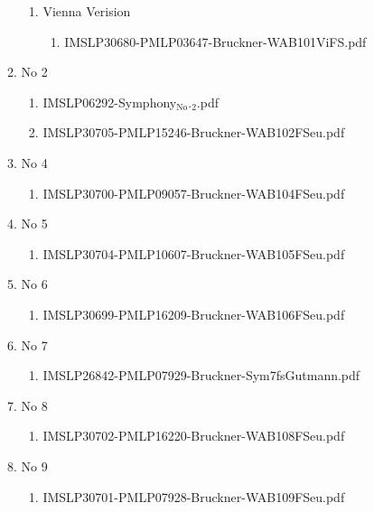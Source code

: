\documentclass[11pt]{article}
\begin{document}
\begin{enumerate}
\begin{enumerate}
\begin{enumerate}
\item Vienna Verision
\label{sec-1-1-1-1-44-16-1-2-2}
\begin{enumerate}
\item IMSLP30680-PMLP03647-Bruckner-WAB101ViFS.pdf
\label{sec-1-1-1-1-44-16-1-2-2-1}
\end{enumerate}
\end{enumerate}

\item No 2
\label{sec-1-1-1-1-44-16-1-3}
\begin{enumerate}
\item IMSLP06292-Symphony$_{\text{No}}$.$_{\text{2}}$.pdf
\label{sec-1-1-1-1-44-16-1-3-1}

\item IMSLP30705-PMLP15246-Bruckner-WAB102FSeu.pdf
\label{sec-1-1-1-1-44-16-1-3-2}
\end{enumerate}

\item No 4
\label{sec-1-1-1-1-44-16-1-4}
\begin{enumerate}
\item IMSLP30700-PMLP09057-Bruckner-WAB104FSeu.pdf
\label{sec-1-1-1-1-44-16-1-4-1}
\end{enumerate}

\item No 5
\label{sec-1-1-1-1-44-16-1-5}
\begin{enumerate}
\item IMSLP30704-PMLP10607-Bruckner-WAB105FSeu.pdf
\label{sec-1-1-1-1-44-16-1-5-1}
\end{enumerate}

\item No 6
\label{sec-1-1-1-1-44-16-1-6}
\begin{enumerate}
\item IMSLP30699-PMLP16209-Bruckner-WAB106FSeu.pdf
\label{sec-1-1-1-1-44-16-1-6-1}
\end{enumerate}

\item No 7
\label{sec-1-1-1-1-44-16-1-7}
\begin{enumerate}
\item IMSLP26842-PMLP07929-Bruckner-Sym7fsGutmann.pdf
\label{sec-1-1-1-1-44-16-1-7-1}
\end{enumerate}

\item No 8
\label{sec-1-1-1-1-44-16-1-8}
\begin{enumerate}
\item IMSLP30702-PMLP16220-Bruckner-WAB108FSeu.pdf
\label{sec-1-1-1-1-44-16-1-8-1}
\end{enumerate}

\item No 9
\label{sec-1-1-1-1-44-16-1-9}
\begin{enumerate}
\item IMSLP30701-PMLP07928-Bruckner-WAB109FSeu.pdf
\label{sec-1-1-1-1-44-16-1-9-1}
\end{enumerate}
\end{enumerate}
\end{enumerate}
\end{document}
